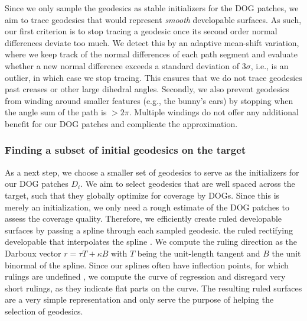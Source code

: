 Since we only sample the geodesics as stable initializers for the DOG patches, we aim to trace geodesics that would represent \emph{smooth} developable surfaces. As such, our first criterion is to stop tracing a geodesic once its second order normal differences deviate too much. 
We detect this by an adaptive mean-shift variation, where we keep track of the normal differences of each path segment and evaluate whether a new normal difference exceeds a standard deviation of $3\sigma$, i.e., is an outlier, in which case we stop tracing.
This ensures that we do not trace geodesics past creases or other large dihedral angles. 
Secondly, we also prevent geodesics from winding around smaller features (e.g., the bunny's ears) by stopping when the angle sum of the path is $> 2 \pi$. Multiple windings do not offer any additional benefit for our DOG patches and complicate the approximation. 


\subsubsection{Finding a subset of initial geodesics on the target} 
\label{sec:graphcut}

As a next step, we choose a smaller set of geodesics to serve as the initializers for our DOG patches $D_i$. We aim to select geodesics that are well spaced across the target, such that they globally optimize for coverage by DOGs. Since this is merely an initialization, we only need a rough estimate of the DOG patches to assess the coverage quality. Therefore, we efficiently create ruled developable surfaces by passing a spline through each sampled geodesic.
the ruled rectifying developable that interpolates the spline \cite{Bo:GeodesicControlled:2007}.
We compute the ruling direction as the Darboux vector $r = \tau T + \kappa B$ with $T$ being the unit-length tangent and $B$ the unit binormal of the spline. 
Since our splines often have inflection points, for which rulings are undefined \cite{do_carmo}, we compute the curve of regression \cite{Pottmann:Book:2001} and disregard very short rulings, as they indicate flat parts on the curve. The resulting ruled surfaces are a very simple representation and only serve the purpose of helping the selection of geodesics.

